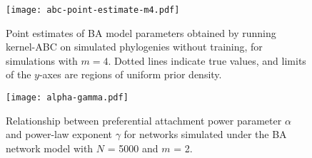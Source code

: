 \documentclass[12pt]{article}\usepackage[]{graphicx}\usepackage[]{color}
\begin{document}
\begin{figure}[ht]
  \centering
  \texttt{[image: abc-point-estimate-m4.pdf]}
  \caption{
    Point estimates of \gls{BA} model parameters obtained by running kernel-ABC
    on simulated phylogenies without training, for simulations with $m = 4$.
    Dotted lines indicate true values, and limits of the $y$-axes are regions
    of uniform prior density.
  }
  \label{fig:abcptm4}
\end{figure}

\begin{figure}[ht]
  \centering
  \texttt{[image: alpha-gamma.pdf]}
  \caption{
      Relationship between preferential attachment power parameter $\alpha$
      and power-law exponent $\gamma$ for networks simulated under the \gls{BA}
      network model with $N$ = 5000 and $m$ = 2.
  }
  \label{fig:gamma}
\end{figure}
\end{document}
